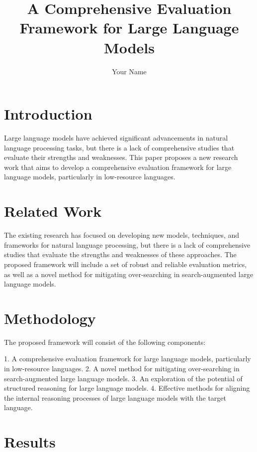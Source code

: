 \documentclass{article}
\begin{document}
\title{A Comprehensive Evaluation Framework for Large Language Models}

\author{Your Name}

\maketitle

\section{Introduction}

Large language models have achieved significant advancements in natural language processing tasks, but there is a lack of comprehensive studies that evaluate their strengths and weaknesses. This paper proposes a new research work that aims to develop a comprehensive evaluation framework for large language models, particularly in low-resource languages.

\section{Related Work}

The existing research has focused on developing new models, techniques, and frameworks for natural language processing, but there is a lack of comprehensive studies that evaluate the strengths and weaknesses of these approaches. The proposed framework will include a set of robust and reliable evaluation metrics, as well as a novel method for mitigating over-searching in search-augmented large language models.

\section{Methodology}

The proposed framework will consist of the following components:

1.  A comprehensive evaluation framework for large language models, particularly in low-resource languages.
2.  A novel method for mitigating over-searching in search-augmented large language models.
3.  An exploration of the potential of structured reasoning for large language models.
4.  Effective methods for aligning the internal reasoning processes of large language models with the target language.

\section{Results}
\end{document}
